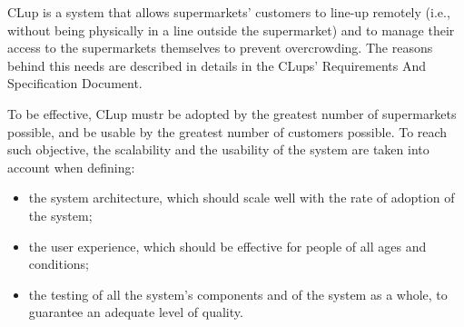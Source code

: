 \documentclass[../../main.tex]{subfiles}
\begin{document}
CLup is a system that allows supermarkets' customers to line-up remotely
(i.e., without being physically in a line outside the supermarket) and to manage their access to the supermarkets themselves to prevent overcrowding. The reasons behind this needs are described in details in the CLups' Requirements And Specification Document.

To be effective, CLup mustr be adopted by the greatest number of supermarkets possible, and be usable by the greatest number of customers possible. To reach such objective, the scalability and the usability of the system are taken into account when defining:

\begin{itemize}
  \item the system architecture, which should scale well with the rate of adoption of the system;
  \item the user experience, which should be effective for people of all ages and conditions;
  \item the testing of all the system's components and of the system as a whole, to guarantee an adequate level of quality.
\end{itemize}
\end{document}
